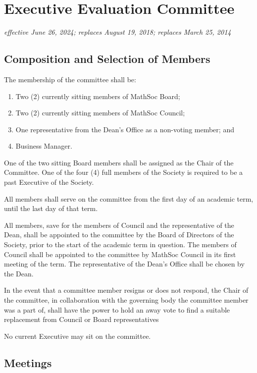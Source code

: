 \section{Executive Evaluation Committee}
\emph{effective June 26, 2024; replaces August 19, 2018; replaces March 25, 2014}\\

\subsection{Composition and Selection of Members}
The membership of the committee shall be:
\begin{enumerate}
	\item Two (2) currently sitting members of MathSoc Board;
	\item Two (2) currently sitting members of MathSoc Council;
	\item One representative from the Dean's Office as a non-voting member; and
	\item Business Manager.
\end{enumerate}

One of the two sitting Board members shall be assigned as the Chair of the Committee.
One of the four (4) full members of the Society is required to be a past Executive of the Society.

All members shall serve on the committee from the first day of an academic
term, until the last day of that term.

All members, save for the members of Council and the representative of the
Dean, shall be appointed to the committee by the Board of Directors of the
Society, prior to the start of the academic term in question. The members of
Council shall be appointed to the committee by MathSoc Council in its first
meeting of the term. The representative of the Dean's Office shall be chosen by
the Dean.

In the event that a committee member resigns or does not respond, the Chair of the committee, in collaboration with the governing body the committee member was a part of, shall have the power to hold an away vote to find a suitable replacement from Council or Board representatives

No current Executive may sit on the committee.

\subsection{Meetings}

